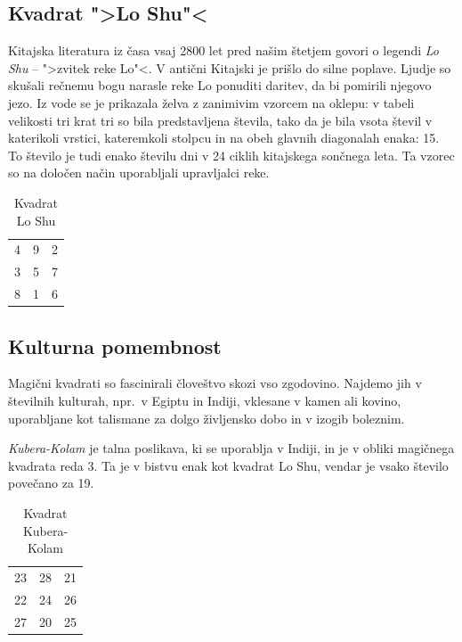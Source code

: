 \documentclass[a4paper,12pt]{article}
\theoremstyle{definition}
\theoremstyle{plain}
\newcommand{\pojem}[1]{\emph{\color{purple}#1}}
\newenvironment{magic}[3]{%
    \begin{table}[ht]
    \centering
    \caption{#2}
    \label{#3}
    \begin{tabular}{|*{#1}{c|}} %
    \hline
}{%
    \hline
    \end{tabular}
    \end{table}
}
\begin{document}
\subsection{Kvadrat ">Lo Shu"<}

Kitajska literatura iz časa vsaj 2800 let pred našim štetjem govori o legendi
\pojem{Lo Shu} -- ">zvitek reke Lo"<. V antični Kitajski je prišlo do
silne poplave. Ljudje so skušali rečnemu bogu narasle reke Lo ponuditi daritev,
da bi pomirili njegovo jezo. Iz vode se je prikazala želva z zanimivim vzorcem
na oklepu: v tabeli velikosti tri krat tri so bila predstavljena števila, tako
da je bila vsota števil v katerikoli vrstici, kateremkoli stolpcu in na obeh
glavnih diagonalah enaka: 15. To število je tudi enako številu dni v 24 ciklih
kitajskega sončnega leta. Ta vzorec so na določen način uporabljali upravljalci
reke.

\begin{magic}{3}{Kvadrat Lo Shu}{table:loshu}
4 & 9 & 2 \\
3 & 5 & 7 \\
8 & 1 & 6 \\
\end{magic}


\subsection{Kulturna pomembnost}

Magični kvadrati so fascinirali človeštvo skozi vso zgodovino. Najdemo jih
v številnih kulturah, npr.\ v Egiptu in Indiji, vklesane v kamen ali
kovino, uporabljane kot talismane za dolgo življensko dobo in v
izogib boleznim.

\pojem{Kubera-Kolam} je talna poslikava, ki se uporablja v Indiji, in je v
obliki magičnega kvadrata reda 3. Ta je v bistvu enak kot kvadrat
Lo Shu, vendar je vsako število povečano za 19.

\begin{magic}{3}{Kvadrat Kubera-Kolam}{table:kubera}
23 & 28 & 21 \\
22 & 24 & 26 \\
27 & 20 & 25 \\
\end{magic}
\end{document}
